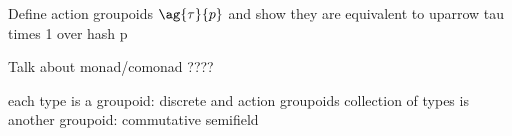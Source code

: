 Define action groupoids $\ag{\tau}{p}$ and show they are equivalent to
uparrow tau times 1 over hash p

Talk about monad/comonad ????

each type is a groupoid: discrete and action groupoids
collection of types is another groupoid: commutative semifield









